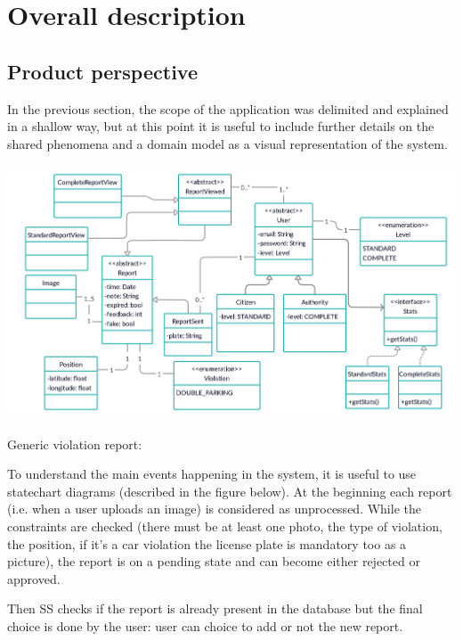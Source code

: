 \documentclass[../RASD.tex]{subfiles}
\begin{document}
    \chapter{Overall description}\label{ch:overall-description}
    \section{Product perspective}\label{sec:product-perspective}
    In the previous section, the scope of the application was delimited and explained in a shallow way, but at this point it is useful to include further details on the shared phenomena and a domain model as a visual representation of the system.
    \begin{center}
        \includegraphics[scale = 0.85]{assets/domainModel.png}\\[1.6 cm]
    \end{center}

    Generic violation report:

    To understand the main events happening in the system, it is useful to use statechart diagrams (described in the figure below). At the beginning each report (i.e. when a user uploads an image) is considered as unprocessed. While the constraints are checked (there must be at least one photo, the type of violation, the position, if it’s a car violation the license plate is mandatory too as a picture), the report is on a pending state and can become either rejected or approved.

    Then SS checks if the report is already present in the database but the final choice is done by the user: user can choice to add or not the new report.
\end{document}
